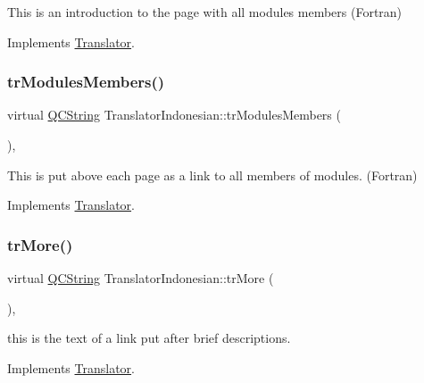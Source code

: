 This is an introduction to the page with all modules members (Fortran) 

Implements \mbox{\hyperlink{class_translator}{Translator}}.

\mbox{\label{class_translator_indonesian_af9a802d17c33026f81392a41d4d1bd99}} 
\subsubsection{\texorpdfstring{trModulesMembers()}{trModulesMembers()}}
{\footnotesize\ttfamily virtual \mbox{\hyperlink{class_q_c_string}{Q\+C\+String}} Translator\+Indonesian\+::tr\+Modules\+Members (\begin{DoxyParamCaption}{ }\end{DoxyParamCaption})\hspace{0.3cm}{\ttfamily [inline]}, {\ttfamily [virtual]}}

This is put above each page as a link to all members of modules. (Fortran) 

Implements \mbox{\hyperlink{class_translator}{Translator}}.

\mbox{\label{class_translator_indonesian_ae3c4c0370c4fc7d108f64d23c2ea785a}} 
\subsubsection{\texorpdfstring{trMore()}{trMore()}}
{\footnotesize\ttfamily virtual \mbox{\hyperlink{class_q_c_string}{Q\+C\+String}} Translator\+Indonesian\+::tr\+More (\begin{DoxyParamCaption}{ }\end{DoxyParamCaption})\hspace{0.3cm}{\ttfamily [inline]}, {\ttfamily [virtual]}}

this is the text of a link put after brief descriptions. 

Implements \mbox{\hyperlink{class_translator}{Translator}}.

\mbox{\label{class_translator_indonesian_a60211c00aa2e822d2cd0164e1a1b356f}} 
